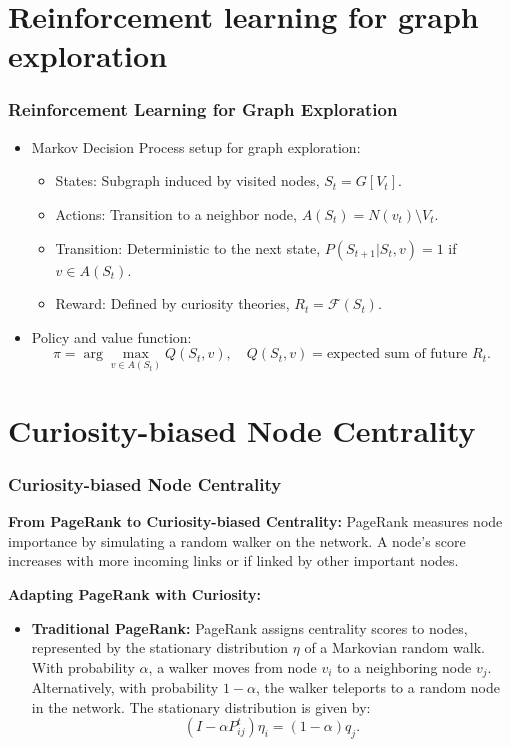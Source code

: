 \documentclass{beamer}
\begin{document}

\section{Reinforcement learning for graph exploration}
\begin{frame}
\frametitle{Reinforcement Learning for Graph Exploration}
\begin{itemize}
    \item Markov Decision Process setup for graph exploration:
    \begin{itemize}
        \item States: Subgraph induced by visited nodes, $S_t = G[V_t]$.
        \item Actions: Transition to a neighbor node, $A(S_t) = N(v_t) \setminus V_t$.
        \item Transition: Deterministic to the next state, $P(S_{t+1} | S_t, v) = 1$ if $v \in A(S_t)$.
        \item Reward: Defined by curiosity theories, $R_t = \mathcal{F}(S_t)$.
    \end{itemize}
    
    \item Policy and value function:
    \begin{equation}
    \pi = \arg \max_{v \in A(S_t)} Q(S_t, v), \quad Q(S_t, v) = \text{expected sum of future } R_t.
    \end{equation}
    
\end{itemize}
\end{frame}



\section{Curiosity-biased Node Centrality}
\begin{frame}
\frametitle{Curiosity-biased Node Centrality}
\textbf{From PageRank to Curiosity-biased Centrality:}
PageRank measures node importance by simulating a random walker on the network. A node's score increases with more incoming links or if linked by other important nodes.

\textbf{Adapting PageRank with Curiosity:}
\begin{itemize}
    \item \textbf{Traditional PageRank:} PageRank assigns centrality scores to nodes, represented by the stationary distribution $\eta$ of a Markovian random walk. With probability $\alpha$, a walker moves from node $v_i$ to a neighboring node $v_j$. Alternatively, with probability $1-\alpha$, the walker teleports to a random node in the network. The stationary distribution is given by:
\begin{equation}
(I - \alpha P_{ij}^t) \eta_i = (1 - \alpha)q_j.
\end{equation}

 \end{itemize}
\end{frame}
\end{document}
